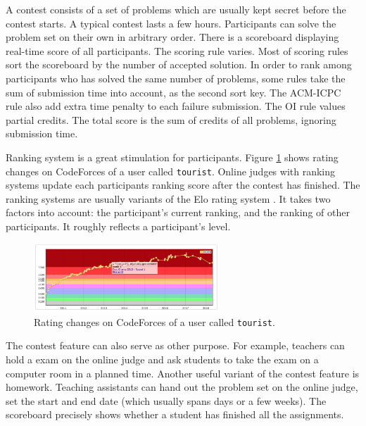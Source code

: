             A contest consists of a set of problems
            which are usually kept secret before the contest starts.
            A typical contest lasts a few hours.
            Participants can solve the problem set on their own in arbitrary order.
            There is a scoreboard displaying real-time score of all participants.
            The scoring rule varies.
            Most of scoring rules sort the scoreboard by the number of accepted solution.
            In order to rank among participants who has solved the same number of problems,
            some rules take the sum of submission time into account, as the second sort key.
            The ACM-ICPC rule also add extra time penalty to each failure submission.
            The OI rule values partial credits.
            The total score is the sum of credits of all problems, ignoring submission time.

            Ranking system is a great stimulation for participants.
            Figure \ref{fig:codeforces-rating} shows rating changes on CodeForces of a user called \texttt{tourist}.
            Online judges with ranking systems update each participants ranking score
            after the contest has finished.
            The ranking systems are usually variants \cite{bailey_algorithm_2018,mirzayanov_open_2015}
            of the Elo rating system \cite{elo1978rating}.
            It takes two factors into account:
            the participant's current ranking, and the ranking of other participants.
            It roughly reflects a participant's level.

            \begin{figure}[htp]
                \centering
                \includegraphics[width=0.62\textwidth]{img/codeforces-rating.png}
                \caption{Rating changes on CodeForces of a user called \texttt{tourist}.}
                \label{fig:codeforces-rating}
            \end{figure}

            The contest feature can also serve as other purpose.
            For example, teachers can hold a exam on the online judge
            and ask students to take the exam on a computer room in a planned time.
            Another useful variant of the contest feature is homework.
            Teaching assistants can hand out the problem set on the online judge,
            set the start and end date (which usually spans days or a few weeks).
            The scoreboard precisely shows whether a student has finished all the assignments.

